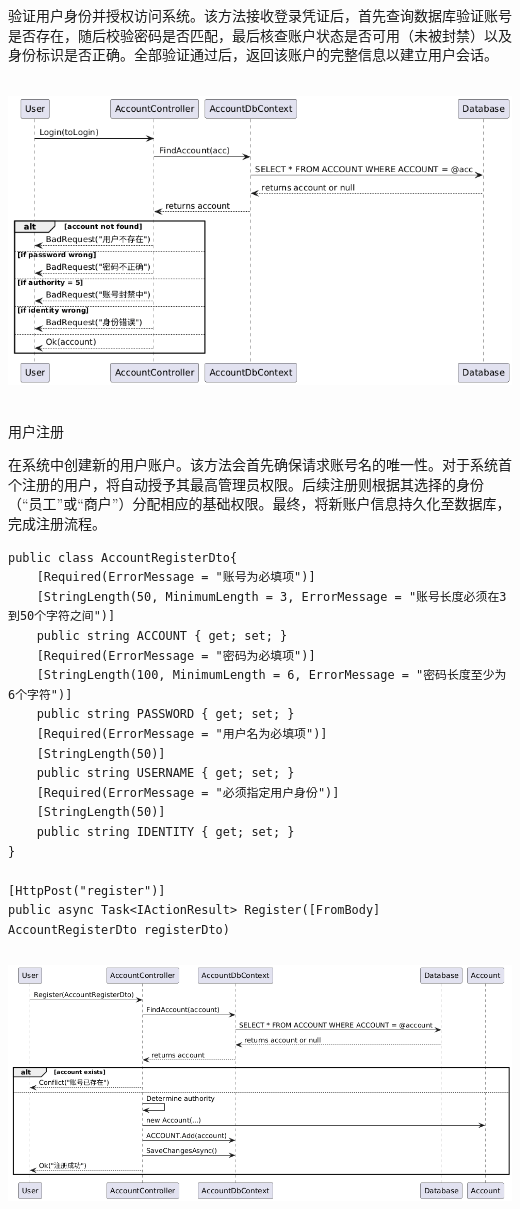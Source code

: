 \documentclass[]{article}
\let\oldincludegraphics\includegraphics
\renewcommand{\includegraphics}[2][]{%
  \begin{center}\oldincludegraphics[#1]{#2}\end{center}%
}
\begin{document}
验证用户身份并授权访问系统。该方法接收登录凭证后，首先查询数据库验证账号是否存在，随后校验密码是否匹配，最后核查账户状态是否可用（未被封禁）以及身份标识是否正确。全部验证通过后，返回该账户的完整信息以建立用户会话。\includegraphics[width=5.88681in,height=3.37778in]{media/media/image5.png}

用户注册

在系统中创建新的用户账户。该方法会首先确保请求账号名的唯一性。对于系统首个注册的用户，将自动授予其最高管理员权限。后续注册则根据其选择的身份（``员工''或``商户''）分配相应的基础权限。最终，将新账户信息持久化至数据库，完成注册流程。
\begin{verbatim}
public class AccountRegisterDto{
    [Required(ErrorMessage = "账号为必填项")]
    [StringLength(50, MinimumLength = 3, ErrorMessage = "账号长度必须在3到50个字符之间")]
    public string ACCOUNT { get; set; }
    [Required(ErrorMessage = "密码为必填项")]
    [StringLength(100, MinimumLength = 6, ErrorMessage = "密码长度至少为6个字符")]
    public string PASSWORD { get; set; }
    [Required(ErrorMessage = "用户名为必填项")]
    [StringLength(50)]
    public string USERNAME { get; set; }
    [Required(ErrorMessage = "必须指定用户身份")]
    [StringLength(50)]
    public string IDENTITY { get; set; }
}

[HttpPost("register")]
public async Task<IActionResult> Register([FromBody] AccountRegisterDto registerDto)
\end{verbatim}

\includegraphics[width=5.75347in,height=2.69097in]{media/media/image6.png}
\end{document}
